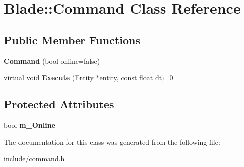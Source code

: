 \hypertarget{class_blade_1_1_command}{}\section{Blade\+:\+:Command Class Reference}
\label{class_blade_1_1_command}
\subsection*{Public Member Functions}
\begin{DoxyCompactItemize}
\item 
\mbox{\label{class_blade_1_1_command_ad2d8d0d0f38cb5e3142ae4876e041946}} 
{\bfseries Command} (bool online=false)
\item 
\mbox{\label{class_blade_1_1_command_a9110a3b9580a9e820c9318cf96bb6c41}} 
virtual void {\bfseries Execute} (\hyperlink{class_blade_1_1_entity}{Entity} $\ast$entity, const float dt)=0
\end{DoxyCompactItemize}
\subsection*{Protected Attributes}
\begin{DoxyCompactItemize}
\item 
\mbox{\label{class_blade_1_1_command_ab473805a51a806fc54204078604d4550}} 
bool {\bfseries m\+\_\+\+Online}
\end{DoxyCompactItemize}


The documentation for this class was generated from the following file\+:\begin{DoxyCompactItemize}
\item 
include/command.\+h\end{DoxyCompactItemize}
